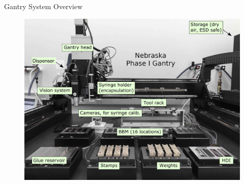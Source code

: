 \documentclass[english,aspectratio=43,8pt]{beamer}
\begin{document}
\begin{frame}{Gantry System Overview}
    \begin{figure}
        \includegraphics[width=\textwidth]{figures/gantry.png}
    \end{figure}
\end{frame}
\end{document}
